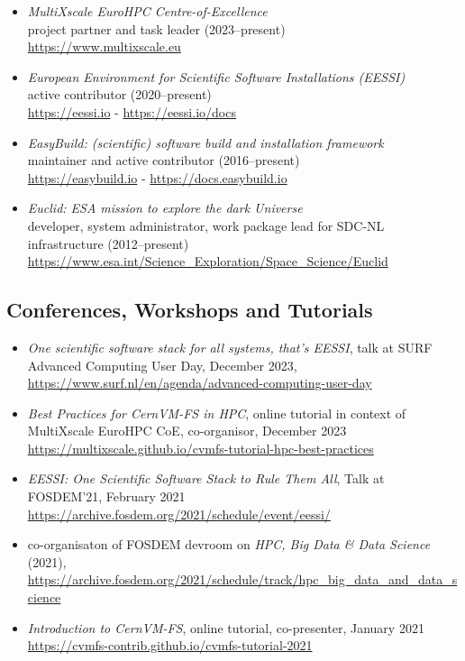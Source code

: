 \begin{itemize}
    \item[] \emph{MultiXscale EuroHPC Centre-of-Excellence}
        \\project partner and task leader (2023--present)
        \\{\small{\url{https://www.multixscale.eu}}}
    \item[] \emph{European Environment for Scientific Software Installations (EESSI)}
        \\active contributor (2020--present)
        \\{\small{\url{https://eessi.io} - \url{https://eessi.io/docs}}}
    \item[] \emph{EasyBuild: (scientific) software build and installation framework}
        \\maintainer and active contributor (2016--present)
        \\{\small{\url{https://easybuild.io} - \url{https://docs.easybuild.io}}}
    \item[] \emph{Euclid: ESA mission to explore the dark Universe}
        \\developer, system administrator, work package lead for SDC-NL infrastructure (2012--present)
        \\{\small{\url{https://www.esa.int/Science_Exploration/Space_Science/Euclid}}}
\end{itemize}

\subsection*{Conferences, Workshops and Tutorials}

\begin{itemize}

\item[] \emph{One scientific software stack for all systems, that's EESSI}, talk at SURF Advanced Computing User Day, December 2023, 
        \\{\small{\url{https://www.surf.nl/en/agenda/advanced-computing-user-day}}}
\item[] \emph{Best Practices for CernVM-FS in HPC}, online tutorial in context of MultiXscale EuroHPC CoE, co-organisor, December 2023
        \\{\small{\url{https://multixscale.github.io/cvmfs-tutorial-hpc-best-practices}}}
\item[] \emph{EESSI: One Scientific Software Stack to Rule Them All}, Talk at FOSDEM'21, February 2021
    \\{\small{\url{https://archive.fosdem.org/2021/schedule/event/eessi/}}}
\item[] co-organisaton of FOSDEM devroom on \emph{HPC, Big Data \& Data Science} (2021),
    \url{https://archive.fosdem.org/2021/schedule/track/hpc_big_data_and_data_science}
\item[] \emph{Introduction to CernVM-FS}, online tutorial, co-presenter, January 2021
    \\{\small{\url{https://cvmfs-contrib.github.io/cvmfs-tutorial-2021}}}

\end{itemize}

